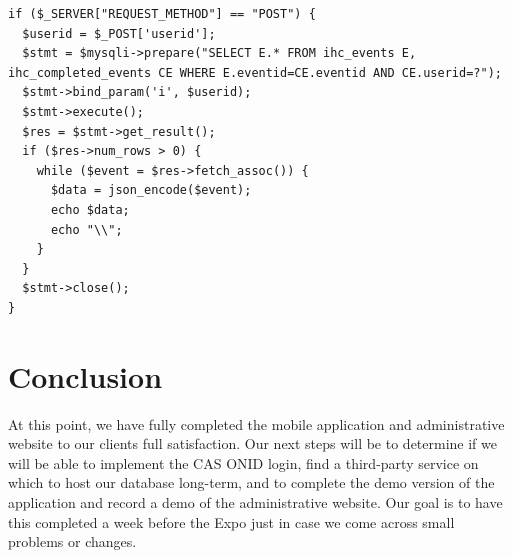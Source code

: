 \documentclass[onecolumn, draftclsnofoot,10pt, compsoc]{IEEEtran}
\begin{document}
    \begin{lstlisting}[style=php]
if ($_SERVER["REQUEST_METHOD"] == "POST") {
  $userid = $_POST['userid'];
  $stmt = $mysqli->prepare("SELECT E.* FROM ihc_events E, ihc_completed_events CE WHERE E.eventid=CE.eventid AND CE.userid=?");
  $stmt->bind_param('i', $userid);
  $stmt->execute();
  $res = $stmt->get_result();
  if ($res->num_rows > 0) {
    while ($event = $res->fetch_assoc()) {
      $data = json_encode($event);
      echo $data;
      echo "\\";
    }
  }
  $stmt->close();
}
    \end{lstlisting}

\section{Conclusion}
  At this point, we have fully completed the mobile application and administrative website to our clients full satisfaction. Our next steps will be to determine if we will be able to implement the CAS ONID login, find a
  third-party service on which to host our database long-term, and to complete the demo version of the application and record a demo of the administrative website. Our goal is to have this completed a week before the Expo just in case we come across small problems or changes.
\end{document}
